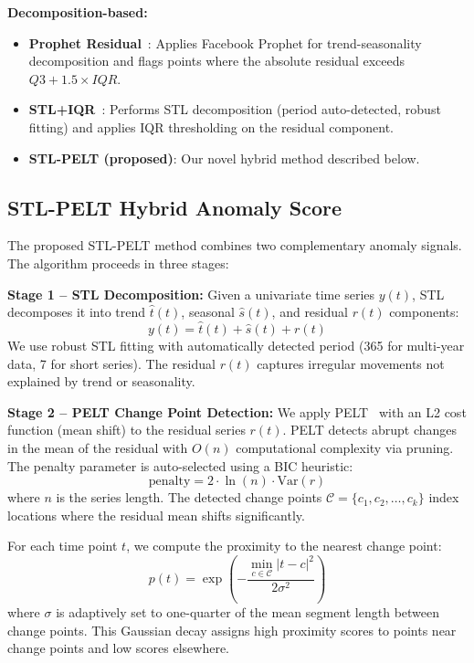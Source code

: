 \documentclass[10pt]{article}
\begin{document}
\noindent\textbf{Decomposition-based:}
\begin{itemize}[leftmargin=*,nosep]
    \item \textbf{Prophet Residual}~\cite{taylor2018prophet}: Applies Facebook Prophet for trend-seasonality decomposition and flags points where the absolute residual exceeds $Q3 + 1.5 \times IQR$.
    \item \textbf{STL+IQR}~\cite{cleveland1990stl}: Performs STL decomposition (period auto-detected, robust fitting) and applies IQR thresholding on the residual component.
    \item \textbf{STL-PELT (proposed)}: Our novel hybrid method described below.
\end{itemize}

\subsection{STL-PELT Hybrid Anomaly Score}
\label{sec:stl_pelt}

The proposed STL-PELT method combines two complementary anomaly signals. The algorithm proceeds in three stages:

\textbf{Stage 1 -- STL Decomposition:} Given a univariate time series $y(t)$, STL~\cite{cleveland1990stl} decomposes it into trend $\hat{t}(t)$, seasonal $\hat{s}(t)$, and residual $r(t)$ components:
\begin{equation}
y(t) = \hat{t}(t) + \hat{s}(t) + r(t)
\end{equation}
We use robust STL fitting with automatically detected period (365 for multi-year data, 7 for short series). The residual $r(t)$ captures irregular movements not explained by trend or seasonality.

\textbf{Stage 2 -- PELT Change Point Detection:} We apply PELT~\cite{killick2012pelt} with an L2 cost function (mean shift) to the residual series $r(t)$. PELT detects abrupt changes in the mean of the residual with $O(n)$ computational complexity via pruning. The penalty parameter is auto-selected using a BIC heuristic:
\begin{equation}
\text{penalty} = 2 \cdot \ln(n) \cdot \text{Var}(r)
\end{equation}
where $n$ is the series length. The detected change points $\mathcal{C} = \{c_1, c_2, \ldots, c_k\}$ index locations where the residual mean shifts significantly.

For each time point $t$, we compute the proximity to the nearest change point:
\begin{equation}
p(t) = \exp\left(-\frac{\min_{c \in \mathcal{C}}|t - c|^2}{2\sigma^2}\right)
\end{equation}
where $\sigma$ is adaptively set to one-quarter of the mean segment length between change points. This Gaussian decay assigns high proximity scores to points near change points and low scores elsewhere.
\end{document}

